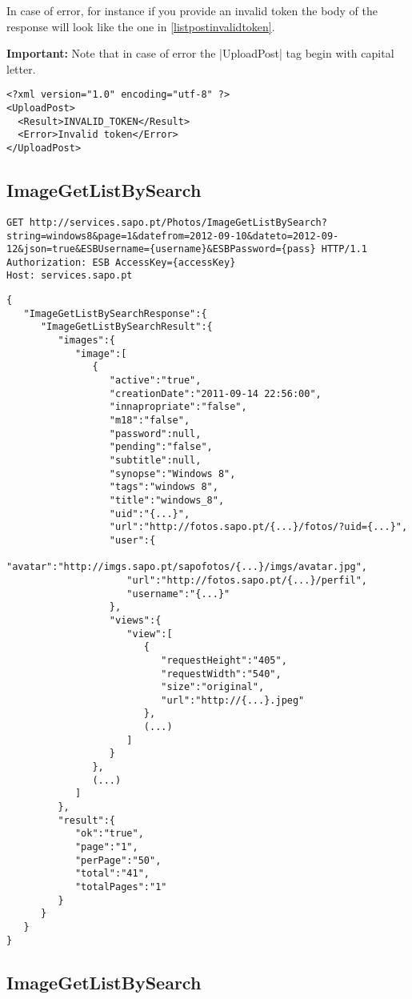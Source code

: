 In case of error, for instance if you provide an invalid token the body of the response will look like the one in \autoref{listpostinvalidtoken}.

\textbf{Important:} Note that in case of error the \icode|UploadPost| tag begin with capital letter.

\begin{lstlisting}[label=listpostinvalidtoken,caption=Response body in case of invalid token]
<?xml version="1.0" encoding="utf-8" ?>
<UploadPost>
  <Result>INVALID_TOKEN</Result>
  <Error>Invalid token</Error>
</UploadPost> 
\end{lstlisting}

\subsection{ImageGetListBySearch}
\label{sec:chapter4:photos:http:imageGetListBySearch}

\begin{lstlisting}[label=imageGetListBySearch,caption=ImageGetListBySearch sample request]
GET http://services.sapo.pt/Photos/ImageGetListBySearch?string=windows8&page=1&datefrom=2012-09-10&dateto=2012-09-12&json=true&ESBUsername={username}&ESBPassword={pass} HTTP/1.1
Authorization: ESB AccessKey={accessKey}
Host: services.sapo.pt
\end{lstlisting}


\begin{lstlisting}[label=imageGetListBySearchResponse,caption=ImageGetListBySearch sample response body]
{
   "ImageGetListBySearchResponse":{
      "ImageGetListBySearchResult":{
         "images":{
            "image":[
               {
                  "active":"true",
                  "creationDate":"2011-09-14 22:56:00",
                  "innapropriate":"false",
                  "m18":"false",
                  "password":null,
                  "pending":"false",
                  "subtitle":null,
                  "synopse":"Windows 8",
                  "tags":"windows 8",
                  "title":"windows_8",
                  "uid":"{...}",
                  "url":"http://fotos.sapo.pt/{...}/fotos/?uid={...}",
                  "user":{
                     "avatar":"http://imgs.sapo.pt/sapofotos/{...}/imgs/avatar.jpg",
                     "url":"http://fotos.sapo.pt/{...}/perfil",
                     "username":"{...}"
                  },
                  "views":{
                     "view":[
                        {
                           "requestHeight":"405",
                           "requestWidth":"540",
                           "size":"original",
                           "url":"http://{...}.jpeg"
                        },
                        (...)
                     ]
                  }
               },
               (...)
            ]
         },
         "result":{
            "ok":"true",
            "page":"1",
            "perPage":"50",
            "total":"41",
            "totalPages":"1"
         }
      }
   }
}
\end{lstlisting}


\subsection{ImageGetListBySearch}
\label{sec:chapter4:photos:http:imageGetListBySearch}

